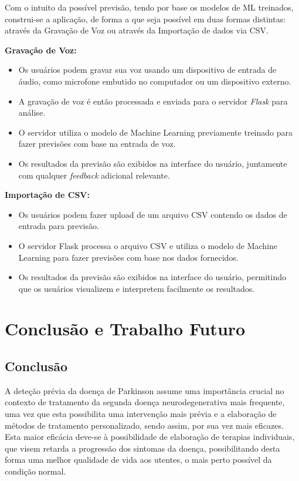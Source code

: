 \documentclass[12pt,a4paper,twoside]{report}
\begin{document}
{Com o intuito da possível previsão, tendo por base os modelos de \gls{ML} treinados, construi-se a aplicação, de forma a que seja possível em duas formas distintas: através da Gravação de Voz ou através da Importação de dados via CSV.

\textbf{Gravação de Voz:}

\begin{itemize}
    \item Os usuários podem gravar sua voz usando um dispositivo de entrada de áudio, como microfone embutido no computador ou um dispositivo externo.
    \item A gravação de voz é então processada e enviada para o servidor \textit{Flask} para análise.
    \item O servidor utiliza o modelo de Machine Learning previamente treinado para fazer previsões com base na entrada de voz.
    \item Os resultados da previsão são exibidos na interface do usuário, juntamente com qualquer \textit{feedback} adicional relevante.
\end{itemize}

\textbf{Importação de CSV:
}
\begin{itemize}
    \item Os usuários podem fazer upload de um arquivo CSV contendo os dados de entrada para previsão.
    \item O servidor Flask processa o arquivo CSV e utiliza o modelo de Machine Learning para fazer previsões com base nos dados fornecidos.
    \item Os resultados da previsão são exibidos na interface do usuário, permitindo que os usuários visualizem e interpretem facilmente os resultados.
\end{itemize}





\chapter{Conclusão e Trabalho Futuro}

\section{Conclusão}

A deteção prévia da doença de Parkinson assume uma importância crucial no
contexto de tratamento da segunda doença neurodegenerativa mais frequente, uma vez que esta possibilita uma intervenção mais prévia e a elaboração de métodos de tratamento personalizado, sendo assim, por sua vez mais eficazes. Esta maior eficácia deve-se à possibilidade de elaboração de terapias individuais, que visem retarda a progressão dos sintomas da doença, possibilitando desta forma uma melhor qualidade de vida aos utentes, o mais perto possível da condição normal.

}
\end{document}
